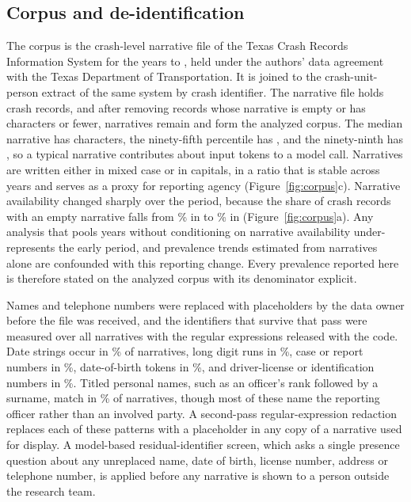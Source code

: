 \subsection{Corpus and de-identification}
\label{sec:corpus}

The corpus is the crash-level narrative file of the Texas Crash Records Information System
for the years \FirstYear{} to \LastYear{}, held under the authors' data agreement with the
Texas Department of Transportation. It is joined to the crash-unit-person extract of the same
system by crash identifier. The narrative file holds \Nrecords{} crash records, and after
removing records whose narrative is empty or has \MinChars{} characters or fewer, \Ncorpus{}
narratives remain and form the analyzed corpus. The median narrative has \MedianChars{}
characters, the ninety-fifth percentile has \LengthPNinetyFive{}, and the ninety-ninth has
\LengthPNinetyNine{}, so a typical narrative contributes about \NarrativeTokens{} input tokens
to a model call. Narratives are written either in mixed case or in capitals, in a ratio that
is stable across years and serves as a proxy for reporting agency (Figure~\ref{fig:corpus}c).
Narrative availability changed sharply over the period, because the share of crash records
with an empty narrative falls from \EmptyShareFirst\% in \FirstYear{} to \EmptyShareLast\% in
\LastYear{} (Figure~\ref{fig:corpus}a). Any analysis that pools years without conditioning on
narrative availability under-represents the early period, and prevalence trends estimated
from narratives alone are confounded with this reporting change. Every prevalence reported
here is therefore stated on the analyzed corpus with its denominator explicit.

Names and telephone numbers were replaced with placeholders by the data owner before the
file was received, and the identifiers that survive that pass were measured over all
\Ncorpus{} narratives with the regular expressions released with the code. Date strings occur
in \PIIDate\% of narratives, long digit runs in \PIIDigitRun\%, case or report numbers in
\PIICase\%, date-of-birth tokens in \PIIDob\%, and driver-license or identification numbers
in \PIIIdNum\%. Titled personal names, such as an officer's rank followed by a surname, match
in \PIITitledName\% of narratives, though most of these name the reporting officer rather than
an involved party. A second-pass regular-expression redaction replaces each of these patterns
with a placeholder in any copy of a narrative used for display. A model-based
residual-identifier screen, which asks a single presence question about any unreplaced name,
date of birth, license number, address or telephone number, is applied before any narrative
is shown to a person outside the research team.

